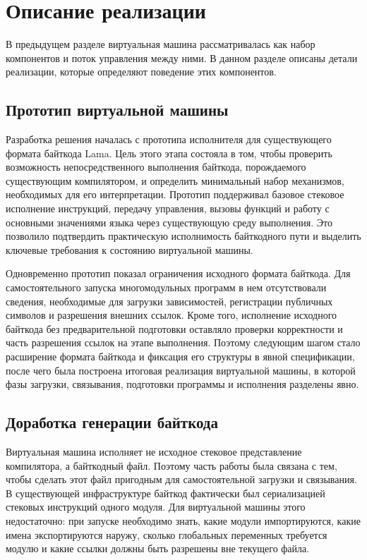 
\section{Описание реализации}
\label{sec:implementation}

В предыдущем разделе виртуальная машина рассматривалась как набор
компонентов и поток управления между ними. В данном разделе описаны детали
реализации, которые определяют поведение этих компонентов.

\subsection{Прототип виртуальной машины}

Разработка решения началась с прототипа исполнителя для существующего формата
байткода Lama. Цель этого этапа состояла в том, чтобы проверить возможность
непосредственного выполнения байткода, порождаемого существующим компилятором,
и определить минимальный набор механизмов, необходимых для его интерпретации.
Прототип поддерживал базовое стековое исполнение инструкций, передачу
управления, вызовы функций и работу с основными значениями языка через
существующую среду выполнения. Это позволило подтвердить практическую
исполнимость байткодного пути и выделить ключевые требования к состоянию
виртуальной машины.

Одновременно прототип показал ограничения исходного формата байткода. Для
самостоятельного запуска многомодульных программ в нем отсутствовали сведения,
необходимые для загрузки зависимостей, регистрации публичных символов и
разрешения внешних ссылок. Кроме того, исполнение исходного байткода без
предварительной подготовки оставляло проверки корректности и часть разрешения
ссылок на этапе выполнения. Поэтому следующим шагом стало расширение формата
байткода и фиксация его структуры в явной спецификации, после чего была
построена итоговая реализация виртуальной машины, в которой фазы загрузки,
связывания, подготовки программы и исполнения разделены явно.

\subsection{Доработка генерации байткода}

Виртуальная машина исполняет не исходное стековое представление компилятора, а
байткодный файл. Поэтому часть работы была связана с тем, чтобы сделать этот
файл пригодным для самостоятельной загрузки и связывания. В существующей
инфраструктуре байткод фактически был сериализацией стековых инструкций одного
модуля. Для виртуальной машины этого недостаточно: при запуске необходимо
знать, какие модули импортируются, какие имена экспортируются наружу, сколько
глобальных переменных требуется модулю и какие ссылки должны быть разрешены вне
текущего файла.

